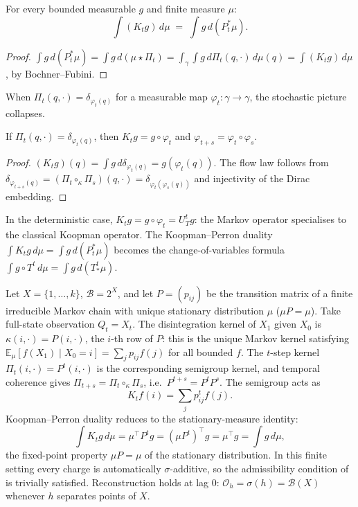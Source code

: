 \begin{theorem}
\label{II:thm:koopman-perron}
For every bounded measurable $g$ and finite measure $\mu$:
\[
  \int (K_t g)\, d\mu \;=\; \int g\, d(P_t^* \mu).
\]
\end{theorem}
\begin{proof}
$\int g\, d(P_t^* \mu)
= \int g\, d(\mu \star \Pi_t)
= \int_\gamma \int g\, d\Pi_t(q, \cdot)\, d\mu(q)
= \int (K_t g)\, d\mu$,
by Bochner--Fubini.
\end{proof}

When $\Pi_t(q, \cdot) = \delta_{\varphi_t(q)}$ for a measurable map
$\varphi_t : \gamma \to \gamma$, the stochastic picture collapses.


\begin{proposition}
\label{II:prop:deterministic}
If $\Pi_t(q, \cdot) = \delta_{\varphi_t(q)}$, then $K_t g = g \circ \varphi_t$
and $\varphi_{t+s} = \varphi_t \circ \varphi_s$.
\end{proposition}
\begin{proof}
$(K_t g)(q) = \int g\, d\delta_{\varphi_t(q)} = g(\varphi_t(q))$.
The flow law follows from
$\delta_{\varphi_{t+s}(q)} = (\Pi_t \circ_\kappa \Pi_s)(q, \cdot)
= \delta_{\varphi_t(\varphi_s(q))}$
and injectivity of the Dirac embedding.
\end{proof}

In the deterministic case, $K_t g = g \circ \varphi_t = U_T^t g$: the Markov
operator specialises to the classical Koopman operator.  The
Koopman--Perron duality $\int K_t g\, d\mu = \int g\, d(P_t^* \mu)$ becomes
the change-of-variables formula $\int g \circ T^t\, d\mu = \int g\, d(T^t_* \mu)$.

\begin{example}
\label{II:ex:markov}
Let $X = \{1,\ldots,k\}$, $\mathcal{B} = 2^X$, and let $P = (p_{ij})$ be the
transition matrix of a finite irreducible Markov chain with unique stationary
distribution $\mu$ ($\mu P = \mu$).  Take full-state observation $Q_t = X_t$.
The disintegration kernel of $X_1$ given $X_0$ is
$\kappa(i,\cdot) = P(i,\cdot)$, the $i$-th row of $P$: this is the unique Markov
kernel satisfying
$\mathbb{E}_\mu[f(X_1) \mid X_0 = i] = \sum_j p_{ij} f(j)$ for all bounded $f$.
The $t$-step kernel $\Pi_t(i,\cdot) = P^t(i,\cdot)$ is the corresponding
semigroup kernel, and temporal coherence gives
$\Pi_{t+s} = \Pi_t \circ_\kappa \Pi_s$, i.e.\ $P^{t+s} = P^t P^s$.
The semigroup acts as
\[
  K_t f(i) = \sum_j p^t_{ij} f(j).
\]
Koopman--Perron duality reduces to the stationary-measure identity:
\[
  \int K_t g\, d\mu = \mu^\top P^t g = (\mu P^t)^\top g = \mu^\top g
  = \int g\, d\mu,
\]
the fixed-point property $\mu P = \mu$ of the stationary distribution.
In this finite setting every charge is automatically $\sigma$-additive, so the
admissibility condition of~\cite{mahon_paper1} is trivially satisfied.
Reconstruction holds at lag $0$: $\mathcal{O}_h = \sigma(h) = \mathcal{B}(X)$
whenever $h$ separates points of $X$.
\end{example}

